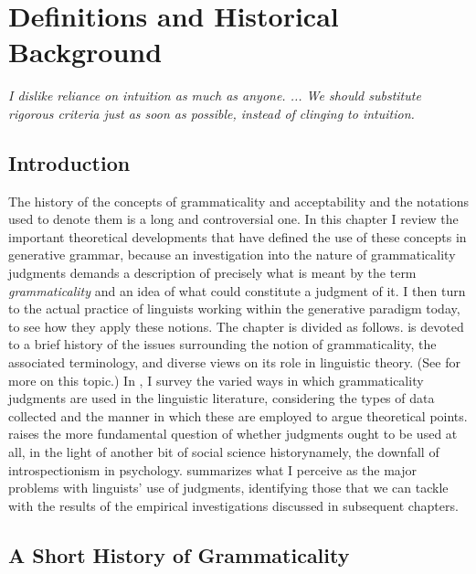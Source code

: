\chapter{Definitions and Historical Background}\label{sec:2}

\epigraph{\textit{I dislike reliance on intuition as much as anyone. ... We should substitute rigorous criteria just as soon as possible, instead of clinging to intuition.\\[-2\baselineskip]}}{\citep{Chomsky1962}}

\section{Introduction} \label{sec:2.1}

The history of the concepts of grammaticality and acceptability and the notations used to denote them is a long and controversial one. In this chapter I review the important theoretical developments that have defined the use of these concepts in generative grammar, because an investigation into the nature of grammaticality judgments demands a description of precisely what is meant by the term \textit{grammaticality} and an idea of what could constitute a judgment of it. I then turn to the actual practice of linguists working within the generative paradigm today, to see how they apply these notions. The chapter is divided as follows.  is devoted to a brief history of the issues surrounding the notion of grammaticality, the associated terminology, and diverse views on its role in linguistic theory. (See \citet[ch. 7]{Harris1993} for more on this topic.) In , I survey the varied ways in which grammaticality judgments are used in the linguistic literature, considering the types of data collected and the manner in which these are employed to argue theoretical points.  raises the more fundamental question of whether judgments ought to be used at all, in the light of another bit of social science history\schdash{}namely, the downfall of introspectionism in psychology.  summarizes what I perceive as the major problems with linguists' use of judgments, identifying those that we can tackle with the results of the empirical investigations discussed in subsequent chapters.

\section{A Short History of Grammaticality} \label{sec:2.2}

